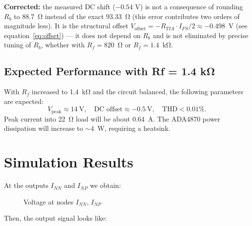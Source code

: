 \documentclass[a4paper, 12pt]{article}
\begin{document}
\textbf{Corrected:} the measured DC shift (\(-0.54\) V) is not a consequence
of rounding \(R_b\) to 88.7~Ω instead of the exact 93.33~Ω (this error
contributes two orders of magnitude less). It is the structural offset
\(V_{\text{offset}} = -R_{TIA}\cdot I_{FS}/2 \approx -0.498\)~V
(see equation~\eqref{eq:offset}) — it does not depend on \(R_b\) and is not
eliminated by precise tuning of \(R_b\), whether with \(R_f=820\)~Ω or
\(R_f=1.4\)~kΩ.

\subsection{Expected Performance with Rf = 1.4 kΩ}

With \(R_f\) increased to 1.4~kΩ and the circuit balanced, the following
parameters are expected:
\[
    V_{\text{peak}} \approx 14\ \text{V},\quad
    \text{DC offset} \approx -0.5\ \text{V},\quad
    \text{THD} < 0.01\%.
\]
Peak current into 22~Ω load will be about 0.64~A.
The ADA4870 power dissipation will increase to \(\sim 4\)~W,
requiring a heatsink.

\section{Simulation Results}

\par At the outputs \(I_{NN}\) and \(I_{NP}\) we obtain:
\begin{figure}[H]
\centering
{}
\caption{Voltage at nodes \(I_{NN}\), \(I_{NP}\)}
\end{figure}

\par Then, the output signal looks like:
\end{document}
